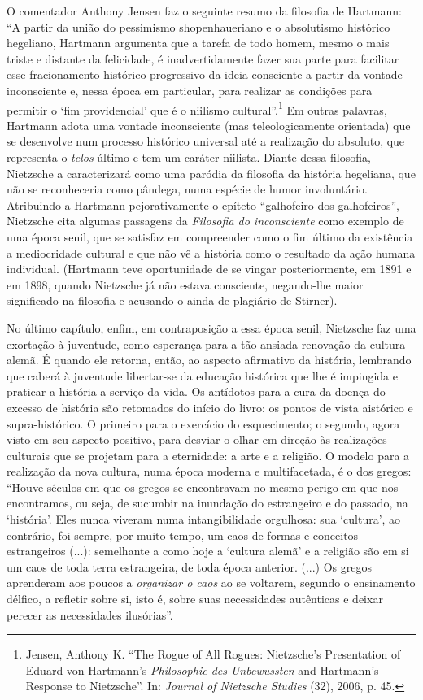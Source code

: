 O comentador Anthony Jensen faz o seguinte resumo da filosofia de
Hartmann: ``A partir da união do pessimismo shopenhaueriano e o
absolutismo histórico hegeliano, Hartmann argumenta que a tarefa de todo
homem, mesmo o mais triste e distante da felicidade, é inadvertidamente
fazer sua parte para facilitar esse fracionamento histórico progressivo
da ideia consciente a partir da vontade inconsciente e, nessa época em
particular, para realizar as condições para permitir o `fim
providencial' que é o niilismo cultural''.\footnote{Jensen, Anthony K.
  ``The Rogue of All Rogues: Nietzsche's Presentation of Eduard von
  Hartmann's \emph{Philosophie des Unbewussten} and Hartmann's Response
  to Nietzsche''. In: \emph{Journal of Nietzsche Studies} (32), 2006, p.
  45.} Em outras palavras, Hartmann adota uma vontade inconsciente (mas
teleologicamente orientada) que se desenvolve num processo histórico
universal até a realização do absoluto, que representa o \emph{telos}
último e tem um caráter niilista. Diante dessa filosofia, Nietzsche a
caracterizará como uma paródia da filosofia da história hegeliana, que
não se reconheceria como pândega, numa espécie de humor involuntário.
Atribuindo a Hartmann pejorativamente o epíteto ``galhofeiro dos
galhofeiros'', Nietzsche cita algumas passagens da \emph{Filosofia do
inconsciente} como exemplo de uma época senil, que se satisfaz em
compreender como o fim último da existência a mediocridade cultural e
que não vê a história como o resultado da ação humana individual.
(Hartmann teve oportunidade de se vingar posteriormente, em 1891 e em
1898, quando Nietzsche já não estava consciente, negando-lhe maior
significado na filosofia e acusando-o ainda de plagiário de Stirner).

No último capítulo, enfim, em contraposição a essa época senil,
Nietzsche faz uma exortação à juventude, como esperança para a tão
ansiada renovação da cultura alemã. É quando ele retorna, então, ao
aspecto afirmativo da história, lembrando que caberá à juventude
libertar-se da educação histórica que lhe é impingida e praticar a
história a serviço da vida. Os antídotos para a cura da doença do
excesso de história são retomados do início do livro: os pontos de vista
aistórico e supra-histórico. O primeiro para o exercício do
esquecimento; o segundo, agora visto em seu aspecto positivo, para
desviar o olhar em direção às realizações culturais que se projetam para
a eternidade: a arte e a religião. O modelo para a realização da nova
cultura, numa época moderna e multifacetada, é o dos gregos: ``Houve
séculos em que os gregos se encontravam no mesmo perigo em que nos
encontramos, ou seja, de sucumbir na inundação do estrangeiro e do
passado, na `história'. Eles nunca viveram numa intangibilidade
orgulhosa: sua `cultura', ao contrário, foi sempre, por muito tempo, um
caos de formas e conceitos estrangeiros (...): semelhante a como hoje a
`cultura alemã' e a religião são em si um caos de toda terra
estrangeira, de toda época anterior. (...) Os gregos aprenderam aos
poucos a \emph{organizar o caos} ao se voltarem, segundo o ensinamento
délfico, a refletir sobre si, isto é, sobre suas necessidades autênticas
e deixar perecer as necessidades ilusórias''.

